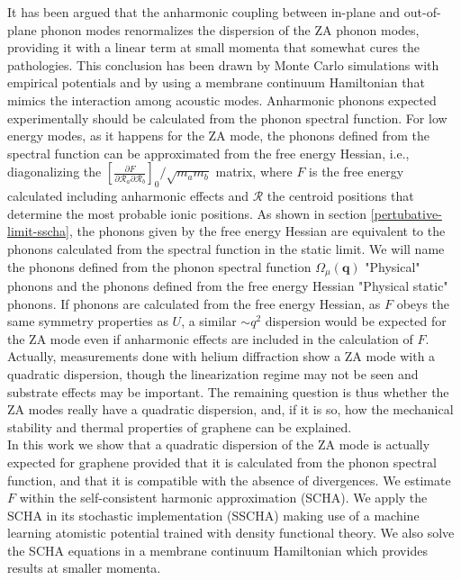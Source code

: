 It has been argued\cite{wang2016anharmonic,los2009scaling,katsnelson2013graphene,zakharchenko2009finite,mariani2008flexural,amorim2014thermodynamics,de2012bending} that the anharmonic coupling between in-plane and out-of-plane phonon 
modes renormalizes the dispersion of the ZA phonon modes, providing it with a linear term at small momenta that 
somewhat cures the pathologies. This conclusion has been drawn by Monte Carlo simulations with empirical 
potentials\cite{wang2016anharmonic,los2009scaling,katsnelson2013graphene,zakharchenko2009finite} and by using a 
membrane continuum  Hamiltonian that mimics the interaction among acoustic 
modes\cite{mariani2008flexural,amorim2014thermodynamics,de2012bending}. Anharmonic phonons expected experimentally 
should be calculated from the phonon spectral function. For low energy modes, as it happens for the ZA mode, the 
phonons defined from the spectral function can be approximated from the
free energy Hessian, i.e., diagonalizing the  $[\frac{\partial F}{\partial \mathcal{R}_a \partial \mathcal{R}_b}]_{0}/\sqrt{m_am_b}$ matrix, where $F$ is the free energy calculated including anharmonic 
effects and $\boldsymbol{\mathcal{R}}$ the centroid positions that determine the most probable ionic 
positions\cite{bianco2017second}. As shown in section \ref{pertubative-limit-sscha}, the phonons given by the free 
energy Hessian are equivalent to the phonons calculated from the spectral function in the static limit. We will name 
the phonons defined from the phonon spectral function $\Omega_{\mu}(\boldsymbol{q})$ "Physical" phonons and the 
phonons defined from the free energy Hessian "Physical static" phonons. 
If phonons are calculated from the free energy Hessian, as $F$ obeys the same symmetry properties as $U$, a similar 
$\sim q^2$ dispersion would be expected for the ZA mode even if anharmonic effects are included in the calculation 
of $F$. Actually, measurements done with helium diffraction show a ZA mode with a quadratic 
dispersion\cite{al2016acoustic,al2015helium,al2018resolving}, though the linearization regime may not be seen and 
substrate effects may be important. The remaining question is thus whether the ZA modes really have a quadratic 
dispersion, and, if it is so, how the mechanical stability and thermal properties of graphene can be explained. \\

In this work we show that a quadratic dispersion of the ZA mode is actually expected for graphene provided that it 
is calculated from the phonon spectral function, and that it is compatible with the absence of 
divergences. We estimate $F$ within the self-consistent harmonic approximation (SCHA). We apply the SCHA in its 
stochastic implementation (SSCHA) making use of a machine learning atomistic potential trained with density 
functional theory\cite{rowe2018development}. We also solve the SCHA equations in a membrane continuum Hamiltonian 
which provides results at smaller momenta.

